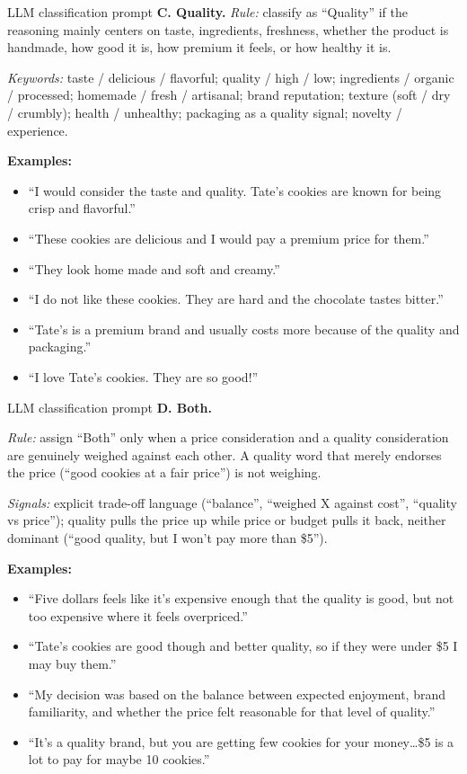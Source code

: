 \documentclass[10pt]{beamer}   %
\begin{document}
\begin{frame}{LLM classification prompt}
\small
\textbf{C. Quality.}
\medskip
\emph{Rule:} classify as ``Quality'' if the reasoning mainly centers on taste, ingredients, freshness, whether the product is handmade, how good it is, how premium it feels, or how healthy it is.
\medskip


\emph{Keywords:} taste / delicious / flavorful; quality / high / low; ingredients / organic / processed; homemade / fresh / artisanal; brand reputation; texture (soft / dry / crumbly); health / unhealthy; packaging as a quality signal; novelty / experience.
\medskip

\textbf{Examples:}
\begin{itemize}
\item ``I would consider the taste and quality. Tate's cookies are known for being crisp and flavorful.''
\item ``These cookies are delicious and I would pay a premium price for them.''
\item ``They look home made and soft and creamy.''
\item ``I do not like these cookies. They are hard and the chocolate tastes bitter.''
\item ``Tate's is a premium brand and usually costs more because of the quality and packaging.''
\item ``I love Tate's cookies. They are so good!''
\end{itemize}
\end{frame}
\medskip

\begin{frame}{LLM classification prompt}
\small
\textbf{D. Both.}

\emph{Rule:} assign ``Both'' only when a price consideration and a quality consideration are genuinely weighed against each other. A quality word that merely endorses the price (``good cookies at a fair price'') is not weighing.
\medskip


\emph{Signals:} explicit trade-off language (``balance'', ``weighed X against cost'', ``quality vs price''); quality pulls the price up while price or budget pulls it back, neither dominant (``good quality, but I won't pay more than \$5'').
\medskip

\textbf{Examples:}
\begin{itemize}
\item ``Five dollars feels like it's expensive enough that the quality is good, but not too expensive where it feels overpriced.''
\item ``Tate's cookies are good though and better quality, so if they were under \$5 I may buy them.''
\item ``My decision was based on the balance between expected enjoyment, brand familiarity, and whether the price felt reasonable for that level of quality.''
\item ``It's a quality brand, but you are getting few cookies for your money\ldots \$5 is a lot to pay for maybe 10 cookies.''
\end{itemize}
\end{frame}
\end{document}
